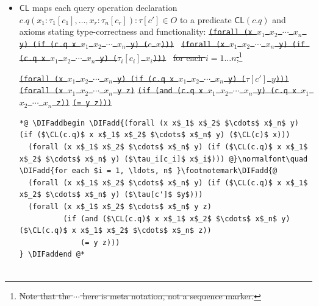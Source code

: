 \documentclass[10pt,fleqn,final]{scrreprt}
\newcommand*{\CL}{\ensuremath{\mathsf{CL}}\xspace}
\newenvironment{definitions}[0]{\medskip }{}
\newcommand{\white}[1]{{\color{white}{#1}}}
\newcommand{\qqquad}{\white{x}\qquad}
\providecommand{\DIFadd}[1]{{\protect\color{blue}\uwave{#1}}} %
\providecommand{\DIFdel}[1]{{\protect\color{red}\sout{#1}}}                      %
\providecommand{\DIFaddbegin}{} %
\providecommand{\DIFaddend}{} %
\providecommand{\DIFdelbegin}{} %
\providecommand{\DIFdelend}{} %
\begin{document}
\begin{definitions}
\begin{itemize}[topsep=0pt, label=--, leftmargin=*]
   \item $\CL$
maps each query operation declaration
$c.q(x_1 : \tau_1[c_1], \dots, x_r : \tau_n[c_r]) : \tau[c'] \in O$
to a predicate $\CL(c.q)$
and axioms stating type-correctness and functionality:
\DIFdelbegin %
\texttt{\DIFdel{(forall (x $x_1$ $x_2$ $\cdots$  $x_n$ y) (if (c.q x $x_1$ $x_2$ $\cdots$  $x_n$ y) ($c$ $x$))) }}
\texttt{\DIFdel{(forall (x $x_1$ $x_2$ $\cdots$  $x_n$ y) (if (c.q x $x_1$ $x_2$ $\cdots$  $x_n$ y) ($\tau_i[c_i]$ $x_i$))) }}
\DIFdel{for each $i=1\ldots n$,}\footnote{\DIFdel{Note that the $\cdots$ here is meta notation, not a sequence marker.}}
\addtocounter{footnote}{-1}%
\texttt{\DIFdel{(forall (x $x_1$ $x_2$ $\cdots$  $x_n$ y) (if (c.q x $x_1$ $x_2$ $\cdots$  $x_n$ y) ($\tau[c']$ $y$))) }}
\texttt{\DIFdel{(forall (x $x_1$ $x_2$ $\cdots$  $x_n$ y z)}}%
\texttt{\DIFdel{(if (and (c.q x $x_1$ $x_2$ $\cdots$  $x_n$ y) (c.q x $x_1$ $x_2$ $\cdots$  $x_n$ z))}}%
\texttt{\DIFdel{(= y z)))}}
\DIFdelend %
 \begin{lstlisting}[language=clif, mathescape, escapechar=@]
 *@ \DIFaddbegin \DIFadd{(forall (x x$_1$ x$_2$ $\cdots$ x$_n$ y) (if ($\CL(c.q)$ x x$_1$ x$_2$ $\cdots$ x$_n$ y) ($\CL(c)$ x)))
  (forall (x x$_1$ x$_2$ $\cdots$ x$_n$ y) (if ($\CL(c.q)$ x x$_1$ x$_2$ $\cdots$ x$_n$ y) ($\tau_i[c_i]$ x$_i$))) @}\normalfont\quad \DIFadd{for each $i = 1, \ldots, n$ }\footnotemark\DIFadd{@
  (forall (x x$_1$ x$_2$ $\cdots$ x$_n$ y) (if ($\CL(c.q)$ x x$_1$ x$_2$ $\cdots$ x$_n$ y) ($\tau[c']$ $y$)))
  (forall (x x$_1$ x$_2$ $\cdots$ x$_n$ y z)
          (if (and ($\CL(c.q)$ x x$_1$ x$_2$ $\cdots$ x$_n$ y) ($\CL(c.q)$ x x$_1$ x$_2$ $\cdots$ x$_n$ z))
              (= y z)))
} \DIFaddend @*


\end{lstlisting}
\end{itemize}
\end{definitions}
\end{document}
